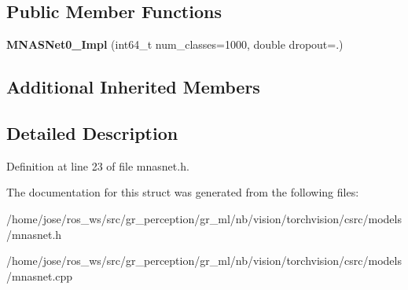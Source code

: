 \subsection*{Public Member Functions}
\begin{DoxyCompactItemize}
\item 
\mbox{\label{structvision_1_1models_1_1MNASNet0__75Impl_aff5f051b31ec99364507fb64cb73e328}} 
{\bfseries M\+N\+A\+S\+Net0\+\_\+Impl} (int64\+\_\+t num\+\_\+classes=1000, double dropout=.)
\end{DoxyCompactItemize}
\subsection*{Additional Inherited Members}


\subsection{Detailed Description}


Definition at line 23 of file mnasnet.\+h.



The documentation for this struct was generated from the following files\+:\begin{DoxyCompactItemize}
\item 
/home/jose/ros\+\_\+ws/src/gr\+\_\+perception/gr\+\_\+ml/nb/vision/torchvision/csrc/models/mnasnet.\+h\item 
/home/jose/ros\+\_\+ws/src/gr\+\_\+perception/gr\+\_\+ml/nb/vision/torchvision/csrc/models/mnasnet.\+cpp\end{DoxyCompactItemize}
